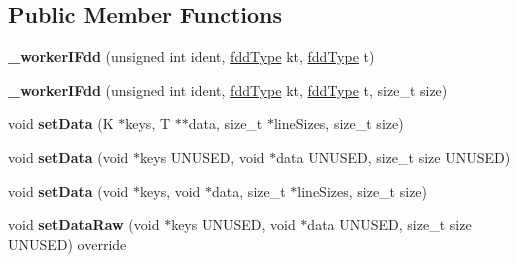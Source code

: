 \subsection*{Public Member Functions}
\begin{DoxyCompactItemize}
\item 
\hypertarget{classfaster_1_1__workerIFdd_3_01K_00_01T_01_5_01_4_a9f0be9976988a83b3339d8387ff8e2e1}{}\label{classfaster_1_1__workerIFdd_3_01K_00_01T_01_5_01_4_a9f0be9976988a83b3339d8387ff8e2e1} 
{\bfseries \+\_\+worker\+I\+Fdd} (unsigned int ident, \hyperlink{namespacefaster_aa8898687bc64536b60a3d5f365060cd6}{fdd\+Type} kt, \hyperlink{namespacefaster_aa8898687bc64536b60a3d5f365060cd6}{fdd\+Type} t)
\item 
\hypertarget{classfaster_1_1__workerIFdd_3_01K_00_01T_01_5_01_4_a98d1388d2afd0339d5c04a985e6eb8d1}{}\label{classfaster_1_1__workerIFdd_3_01K_00_01T_01_5_01_4_a98d1388d2afd0339d5c04a985e6eb8d1} 
{\bfseries \+\_\+worker\+I\+Fdd} (unsigned int ident, \hyperlink{namespacefaster_aa8898687bc64536b60a3d5f365060cd6}{fdd\+Type} kt, \hyperlink{namespacefaster_aa8898687bc64536b60a3d5f365060cd6}{fdd\+Type} t, size\+\_\+t size)
\item 
\hypertarget{classfaster_1_1__workerIFdd_3_01K_00_01T_01_5_01_4_ab87f4b8c53a15b94190cbcbba67e8c8b}{}\label{classfaster_1_1__workerIFdd_3_01K_00_01T_01_5_01_4_ab87f4b8c53a15b94190cbcbba67e8c8b} 
void {\bfseries set\+Data} (K $\ast$keys, T $\ast$$\ast$data, size\+\_\+t $\ast$line\+Sizes, size\+\_\+t size)
\item 
\hypertarget{classfaster_1_1__workerIFdd_3_01K_00_01T_01_5_01_4_a08aa87e7f72eec843f350725d62b76ee}{}\label{classfaster_1_1__workerIFdd_3_01K_00_01T_01_5_01_4_a08aa87e7f72eec843f350725d62b76ee} 
void {\bfseries set\+Data} (void $\ast$keys U\+N\+U\+S\+ED, void $\ast$data U\+N\+U\+S\+ED, size\+\_\+t size U\+N\+U\+S\+ED)
\item 
\hypertarget{classfaster_1_1__workerIFdd_3_01K_00_01T_01_5_01_4_a2a73efd212717ed23a1e406635d80f5d}{}\label{classfaster_1_1__workerIFdd_3_01K_00_01T_01_5_01_4_a2a73efd212717ed23a1e406635d80f5d} 
void {\bfseries set\+Data} (void $\ast$keys, void $\ast$data, size\+\_\+t $\ast$line\+Sizes, size\+\_\+t size)
\item 
\hypertarget{classfaster_1_1__workerIFdd_3_01K_00_01T_01_5_01_4_ab46600ab2aa1630da2edf94fa0501182}{}\label{classfaster_1_1__workerIFdd_3_01K_00_01T_01_5_01_4_ab46600ab2aa1630da2edf94fa0501182} 
void {\bfseries set\+Data\+Raw} (void $\ast$keys U\+N\+U\+S\+ED, void $\ast$data U\+N\+U\+S\+ED, size\+\_\+t size U\+N\+U\+S\+ED) override
$$
\end{DoxyCompactItemize}
